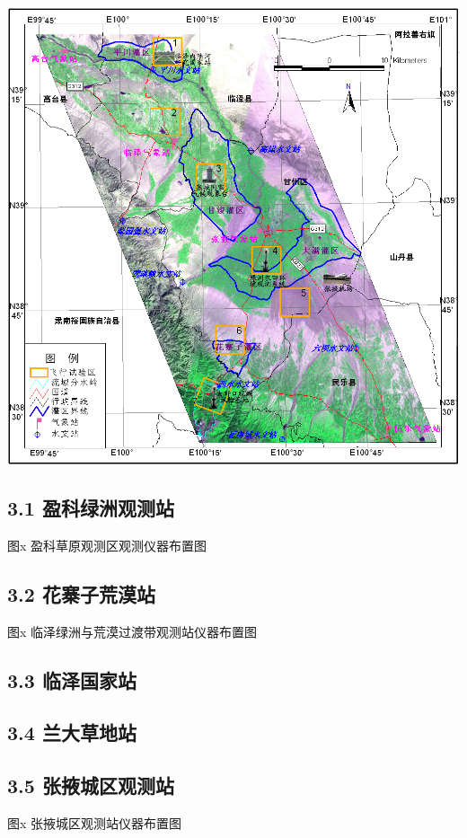 \documentclass[letterpaper,10pt,english]{sphinxmanual}
\begin{document}
\includegraphics{arid_region.png}


\subsection{3.1 盈科绿洲观测站}
\label{water_experiment_area:id6}
图x 盈科草原观测区观测仪器布置图


\subsection{3.2 花寨子荒漠站}
\label{water_experiment_area:id7}
图x 临泽绿洲与荒漠过渡带观测站仪器布置图


\subsection{3.3 临泽国家站}
\label{water_experiment_area:id8}

\subsection{3.4 兰大草地站}
\label{water_experiment_area:id9}

\subsection{3.5 张掖城区观测站}
\label{water_experiment_area:id10}
图x 张掖城区观测站仪器布置图
\end{document}
